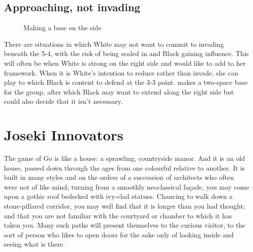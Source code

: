 \documentclass[a5paper,12pt,twoside]{book} %
\newcounter{joseki}                 %
\newcommand{\addstufftotoc}[2][toc]{%
  \addtocontents{#1}{#2}}
\begin{document}
\section{Approaching, not invading}

\begin{figure}[!htbp]
 
\vspace{-0.6cm}\caption{Making a base on the side}
\label{5-4:approach-1}
\end{figure}

\addstufftotoc{\nobreak\smallskip\protect\par}

There are situations in which White may not want to commit to invading beneath the 5-4, with the risk of being sealed in and Black gaining influence. This will often be when White is strong on the right side and would like to add to her framework. When it is White's intention to reduce rather than invade, she can play{\large\whitestone[1]} to which Black is content to defend at the 3-3 point.{\large\whitestone[3]} makes a two-space base for the group, after which Black may want to extend along the right side but could also decide that it isn't necessary.\\



\appendix

\chapter{Joseki Innovators}

The game of Go is like a house: a sprawling, countryside manor. And it is an old house, passed down through the ages from one colourful relative to another. It is built in many styles and on the orders of a succession of architects who often were not of like mind; turning from a smoothly neoclassical façade, you may come upon a gothic roof bedecked with ivy-clad statues. Chancing to walk down a stone-pillared corridor, you may well find that it is longer than you had thought; and that you are not familiar with the courtyard or chamber to which it has taken you. Many such paths will present themselves to the curious visitor, to the sort of person who likes to open doors for the sake only of looking inside and seeing what is there.\\
\end{document}
